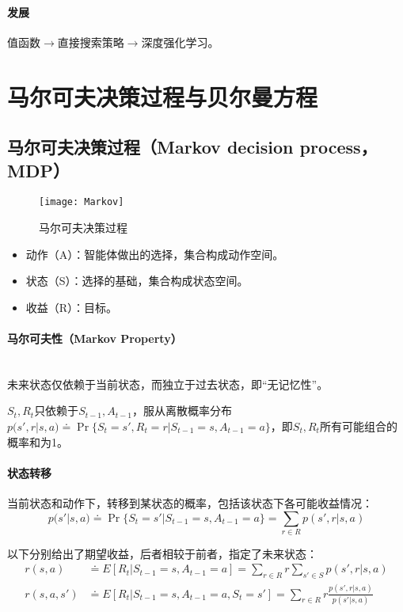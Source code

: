 \documentclass[
12pt, %
a4paper, 
oneside, %
headinclude,footinclude, %
]{scrartcl}
\begin{document}
\paragraph{发展}
值函数$ \rightarrow $直接搜索策略$ \rightarrow $深度强化学习。
\section{马尔可夫决策过程与贝尔曼方程}
\subsection{马尔可夫决策过程（Markov decision process，MDP）}
\begin{figure}[H]
\centering 
\texttt{[image: Markov]} 
\caption[马尔可夫决策过程]{马尔可夫决策过程}
\end{figure}

\begin{itemize}
\item 动作（A）：智能体做出的选择，集合构成动作空间。
\item 状态（S）：选择的基础，集合构成状态空间。
\item 收益（R）：目标。
\end{itemize}
\paragraph{马尔可夫性（Markov Property）}~\\

未来状态仅依赖于当前状态，而独立于过去状态，即“无记忆性”。

$ S_t,R_t $只依赖于$ S_{t - 1},A_{t - 1} $，服从离散概率分布$ p(s', r|s, a) \doteq \Pr\{S_t = s', R_t = r|S_{t - 1} = s, A_{t - 1} = a\} $，即$ S_t,R_t $所有可能组合的概率和为1。
\paragraph{状态转移}
当前状态和动作下，转移到某状态的概率，包括该状态下各可能收益情况：
$$
p(s'|s, a) \doteq \Pr\{S_t = s'|S_{t - 1} = s, A_{t - 1} = a\} = \sum_{r \in R} p(s', r|s, a)
$$

以下分别给出了期望收益，后者相较于前者，指定了未来状态：
\begin{align*}
r(s, a) &\doteq E[R_t|S_{t - 1} = s, A_{t - 1} = a] = \sum_{r \in R} r \sum_{s' \in S} p(s', r|s, a) \\
r(s, a, s') &\doteq E[R_t|S_{t - 1} = s, A_{t - 1} = a, S_t = s'] = \sum_{r \in R} r \frac{p(s', r|s, a)}{p(s'|s, a)}  
\end{align*}
\end{document}
